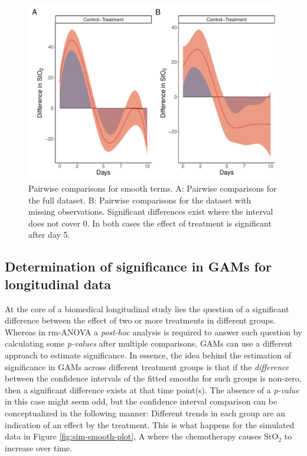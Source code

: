 \documentclass[
]{article}
\begin{document}
\begin{figure}[H]

{\centering \includegraphics[width=0.75\linewidth,]{Full_document_files/figure-latex/plot-pairwise-comp-1} 

}

\caption{Pairwise comparisons for smooth terms. A: Pairwise comparisons for the full dataset. B: Pairwise comparisons for the dataset with missing observations. Significant differences exist where the interval does not cover 0. In both cases the effect of treatment is significant after day 5.}\label{fig:plot-pairwise-comp}
\end{figure}

\hypertarget{GAM-significance}{%
\subsection{Determination of significance in GAMs for longitudinal data}\label{GAM-significance}}

At the core of a biomedical longitudinal study lies the question of a significant difference between the effect of two or more treatments in different groups. Whereas in rm-ANOVA a \emph{post-hoc} analysis is required to answer such question by calculating some \emph{p-values} after multiple comparisons, GAMs can use a different approach to estimate significance. In essence, the idea behind the estimation of significance in GAMs across different treatment groups is that if the \emph{difference} between the confidence intervals of the fitted smooths for such groups is non-zero, then a significant difference exists at that time point(s). The absence of a \emph{p-value} in this case might seem odd, but the confidence interval comparison can be conceptualized in the following manner: Different trends in each group are an indication of an effect by the treatment. This is what happens for the simulated data in Figure \ref{fig:sim-smooth-plot}, A where the chemotherapy causes \(\mbox{StO}_2\) to increase over time.
\end{document}
